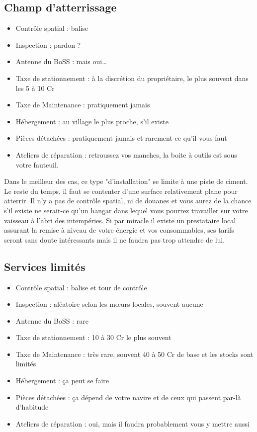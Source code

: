\documentclass{article}
\begin{document}
\subsection*{Champ d'atterrissage}
\begin{itemize}
	\item Contrôle spatial : balise
	\item Inspection : pardon ?
	\item Antenne du BoSS : mais oui\ldots
	\item Taxe de stationnement : à la discrétion du propriétaire, le plus souvent dans les 5 à 10 Cr
	\item Taxe de Maintenance : pratiquement jamais
	\item Hébergement : au village le plus proche, s'il existe
	\item Pièces détachées : pratiquement jamais et rarement ce qu'il vous faut
	\item Ateliers de réparation : retroussez vos manches, la boite à outils est sous votre fauteuil. \\
\end{itemize}

Dans le meilleur des cas, ce type "d'installation" se limite à une piste de ciment. Le reste du temps, il faut se contenter d'une surface relativement plane pour atterrir. Il n'y a pas de contrôle spatial, ni de douanes et vous aurez de la chance s'il existe ne serait-ce qu'un hangar dans lequel vous pourrez travailler sur votre vaisseau à l'abri des intempéries. Si par miracle il existe un prestataire local assurant la remise à niveau de votre énergie et vos consommables, ses tarifs seront sans doute intéressants mais il ne faudra pas trop attendre de lui.

\subsection*{Services limités}
\begin{itemize}
	\item Contrôle spatial : balise et tour de contrôle
	\item Inspection : aléatoire selon les mœurs locales, souvent aucune
	\item Antenne du BoSS : rare
	\item Taxe de stationnement : 10 à 30 Cr le plus souvent
	\item Taxe de Maintenance : très rare, souvent 40 à 50 Cr de base et les stocks sont limités
	\item Hébergement : ça peut se faire
	\item Pièces détachées : ça dépend de votre navire et de ceux qui passent par-là d'habitude
	\item Ateliers de réparation : oui, mais il faudra probablement vous y mettre aussi \\
\end{itemize}
\end{document}
